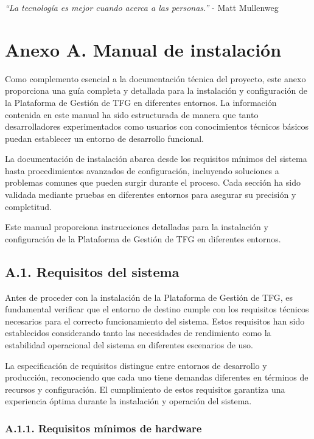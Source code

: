 \documentclass[12pt,a4paper,oneside]{report}
\begin{document}
\emph{``La tecnología es mejor cuando acerca a las personas.''} - Matt
Mullenweg

\chapter{Anexo A. Manual de
instalación}\label{anexo-a.-manual-de-instalaciuxf3n}
Como complemento esencial a la documentación técnica del proyecto, este
anexo proporciona una guía completa y detallada para la instalación y
configuración de la Plataforma de Gestión de TFG en diferentes entornos.
La información contenida en este manual ha sido estructurada de manera
que tanto desarrolladores experimentados como usuarios con conocimientos
técnicos básicos puedan establecer un entorno de desarrollo funcional.

La documentación de instalación abarca desde los requisitos mínimos del
sistema hasta procedimientos avanzados de configuración, incluyendo
soluciones a problemas comunes que pueden surgir durante el proceso.
Cada sección ha sido validada mediante pruebas en diferentes entornos
para asegurar su precisión y completitud.

Este manual proporciona instrucciones detalladas para la instalación y
configuración de la Plataforma de Gestión de TFG en diferentes entornos.

\section{A.1. Requisitos del sistema}\label{a.1.-requisitos-del-sistema}

Antes de proceder con la instalación de la Plataforma de Gestión de TFG,
es fundamental verificar que el entorno de destino cumple con los
requisitos técnicos necesarios para el correcto funcionamiento del
sistema. Estos requisitos han sido establecidos considerando tanto las
necesidades de rendimiento como la estabilidad operacional del sistema
en diferentes escenarios de uso.

La especificación de requisitos distingue entre entornos de desarrollo y
producción, reconociendo que cada uno tiene demandas diferentes en
términos de recursos y configuración. El cumplimiento de estos
requisitos garantiza una experiencia óptima durante la instalación y
operación del sistema.

\subsection{A.1.1. Requisitos mínimos de
hardware}\label{a.1.1.-requisitos-muxednimos-de-hardware}
\end{document}
